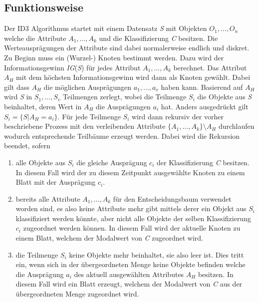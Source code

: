 \subsection{Funktionsweise}
Der ID3 Algorithmus startet mit einem Datensatz \textit{S} mit Objekten $O_{1},...,O_{n}$ welche die Attribute $A_{1},...,A_{k}$ und die Klassifizierung \textit{C} besitzen. \autocites{ImplementationID3}{QuinlanID3} Die Werteausprägungen der Attribute sind dabei normalerweise endlich und diskret. \autocite{ThailandID3}\\
Zu Beginn muss ein (Wurzel-) Knoten bestimmt werden. Dazu wird der Informationsgewinn \textit{IG}(\textit{S}) für jedes Attribut $A_{1},...,A_{k}$ berechnet. Das Attribut $A_{H}$ mit dem höchsten Informationsgewinn wird dann als Knoten gewählt. Dabei gilt dass $A_{H}$ die möglichen Ausprägungen $a_{1},...,a_{v}$ haben kann. Basierend auf $A_{H}$ wird \textit{S} in $S_{1},...,S_{v}$ Teilmengen zerlegt, wobei die Teilmenge $S_{i}$ die Objekte aus \textit{S} beinhaltet, deren Wert in $A_{H}$ die Ausprägungen $a_{i}$ hat. Anders ausgedrückt gilt $S_{i} = \{S\vert A_{H} = a_{i}\}$. Für jede Teilmenge $S_{i}$ wird dann rekursiv der vorher beschriebene Prozess mit den verleibenden Attribute $\{A_{1},...,A_{k}\}\setminus A_{H}$ durchlaufen wodurch entsprechende Teilbäume erzeugt werden. \Autocite{QuinlanID3} Dabei wird die Rekursion beendet, sofern

\begin{enumerate}
    \item alle Objekte aus $S_{i}$ die gleiche Ausprägung $c_{i}$ der Klassifizierung \textit{C} besitzen. In diesem Fall wird der zu diesem Zeitpunkt ausgewählte Knoten zu einem Blatt mit der Ausprägung $c_{i}$. \autocites{QuinlanID3}{PythonCourseDecisionTrees:online}{ID3algor15:online}
    \item bereits alle Attribute $A_{1},...,A_{k}$ für den Entscheidungsbaum verwendet worden sind, es also keine Attribute mehr gibt mittels derer ein Objekt aus $S_{i}$ klassifiziert werden könnte, aber nicht alle Objekte der selben Klassifizierung $c_{i}$ zugeordnet werden können. In diesem Fall wird der aktuelle Knoten zu einem Blatt, welchem der Modalwert von \textit{C} zugeordnet wird.\autocites{QuinlanID3}{PythonCourseDecisionTrees:online}{ID3algor15:online}
    \item die Teilmenge $S_{i}$ keine Objekte mehr beinhaltet, sie also leer ist. Dies tritt ein, wenn sich in der übergeordneten Menge keine Objekte befinden welche die Ausprägung $a_{i}$ des aktuell ausgewählten Attributes $A_{H}$ besitzen. In diesem Fall wird ein Blatt erzeugt, welchem der Modalwert von \textit{C} aus der übergeordneten Menge zugeordnet wird. \autocites{PythonCourseDecisionTrees:online}{ID3algor15:online}
\end{enumerate}

\pagebreak